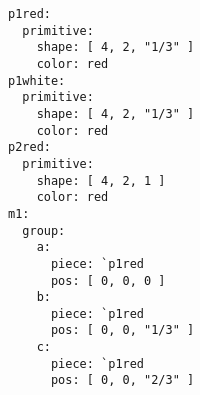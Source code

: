 \par\begin{minipage}{60ex}
\begin{verbatim}
p1red:
  primitive:
    shape: [ 4, 2, "1/3" ]
    color: red
p1white:
  primitive:
    shape: [ 4, 2, "1/3" ]
    color: red
p2red:
  primitive:
    shape: [ 4, 2, 1 ]
    color: red
m1:
  group:
    a:
      piece: `p1red
      pos: [ 0, 0, 0 ]
    b:
      piece: `p1red
      pos: [ 0, 0, "1/3" ]
    c:
      piece: `p1red
      pos: [ 0, 0, "2/3" ]

\end{verbatim}
\end{minipage}\par